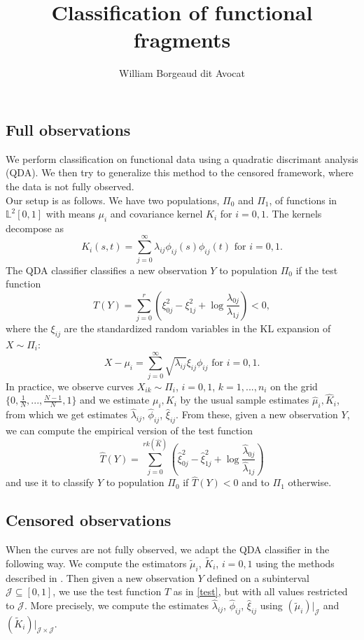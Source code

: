 \documentclass[10pt, a4paper]{article}
\title{Classification of functional fragments}
\author{William Borgeaud dit Avocat}
\date{}
\theoremstyle{remark}
\begin{document}
\maketitle
\subsection*{Full observations}
We perform classification on functional data using a quadratic discrimant analysis (QDA). We then try to generalize this method to the censored framework, where the data is not fully observed. \\
Our setup is as follows. We have two populations, $\Pi_0$ and $\Pi_1$, of functions in $\mathbb{L}^2[0,1]$ with means $\mu_i$ and covariance kernel $K_i$ for $i=0,1$. The kernels decompose as 
$$K_i(s,t) = \sum_{j = 0}^\infty \lambda_{ij} \phi_{ij}(s) \phi_{ij}(t) \text{ \ \ for } i=0,1.$$
The QDA classifier classifies a new observation $Y$ to population $\Pi_0$ if the test function
$$T(Y) = \sum_{j = 0}^{r} \left(\xi_{0j}^2-\xi_{1j}^2 + \log \frac{\lambda_{0j}}{\lambda_{1j}}\right) < 0,$$
where the $\xi_{ij}$ are the standardized random variables in the KL expansion of $X \sim \Pi_i$:
$$X-\mu_i = \sum_{j=0}^{\infty} \sqrt{\lambda_{ij}}\xi_{ij} \phi_{ij} \text{ \ \ for } i=0,1.$$
In practice, we observe curves $X_{ik} \sim \Pi_i$, $i=0,1$, $k=1,...,n_{i}$ on the grid $\{0,\frac{1}{N}, ..., \frac{N-1}{N},1\}$ and we estimate $\mu_i, K_i$ by the usual sample estimates $\hat{\mu}_i, \hat{K}_i$, from which we get estimates $\hat{\lambda}_{ij}$, $\hat{\phi}_{ij}$, $\hat{\xi}_{ij}$. From these, given a new observation $Y$, we can compute the empirical version of the test function 
\begin{equation}\label{test}
	\hat{T}(Y) = \sum_{j = 0}^{rk(\hat{K})} \left(\hat{\xi}_{0j}^2-\hat{\xi}_{1j}^2 + \log \frac{\hat{\lambda}_{0j}}{\hat{\lambda}_{1j}}\right)
\end{equation}
and use it to classify $Y$ to population $\Pi_0$ if $\hat{T}(Y)<0$ and to $\Pi_1$ otherwise.

\subsection*{Censored observations}
When the curves are not fully observed, we adapt the QDA classifier in the following way. We compute the estimators $\tilde{\mu}_i$, $\tilde{K}_i$, $i=0,1$ using the methods described in \cite{pana}. Then given a new observation $Y$ defined on a subinterval $\mathcal{J} \subseteq [0,1]$, we use the test function $T$ as in \ref{test}, but with all values restricted to $\mathcal{J}$. More precisely, we compute the estimates $\hat{\lambda}_{ij}$, $\hat{\phi}_{ij}$, $\hat{\xi}_{ij}$ using $(\tilde{\mu}_i)|_\mathcal{J}$ and $(\tilde{K}_i)|_{\mathcal{J} \times \mathcal{J}}$.
\end{document}
